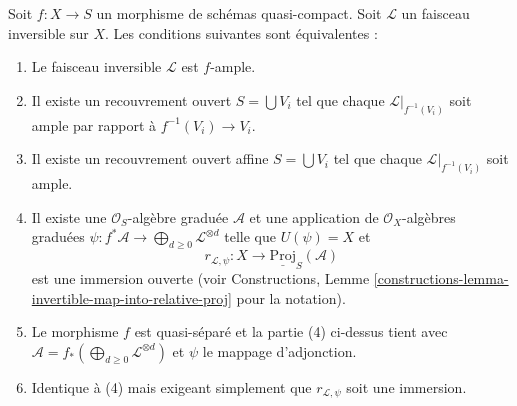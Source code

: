 \begin{lemma}
\label{lemma-characterize-relatively-ample}
\begin{reference}
\cite[II, Proposition 4.6.3]{EGA}
\end{reference}
Soit $f : X \to S$ un morphisme de schémas quasi-compact. Soit $\mathcal{L}$
un faisceau inversible sur $X$. Les conditions
suivantes sont équivalentes :
\begin{enumerate}
\item Le faisceau inversible $\mathcal{L}$ est $f$-ample.
\item Il existe un recouvrement ouvert $S = \bigcup V_i$
tel que chaque $\mathcal{L}|_{f^{-1}(V_i)}$ soit ample
par rapport à $f^{-1}(V_i) \to V_i$.
\item Il existe un recouvrement ouvert affine $S = \bigcup V_i$
tel que chaque $\mathcal{L}|_{f^{-1}(V_i)}$ soit ample.
\item Il existe une $\mathcal{O}_S$-algèbre graduée
$\mathcal{A}$ et une application de $\mathcal{O}_X$-algèbres
graduées $\psi : f^*\mathcal{A} \to \bigoplus_{d \geq 0} \mathcal{L}^{\otimes d}$ telle que
$U(\psi) = X$ et
$$
r_{\mathcal{L}, \psi} :
X
\longrightarrow
\underline{\text{Proj}}_S(\mathcal{A})
$$
est une immersion ouverte (voir
Constructions, Lemme \ref{constructions-lemma-invertible-map-into-relative-proj} pour la notation).
\item Le morphisme $f$ est quasi-séparé
et la partie
(4) ci-dessus tient avec $\mathcal{A} = f_*(\bigoplus_{d \geq 0} \mathcal{L}^{\otimes d})$ et $\psi$
le mappage d'adjonction.
\item Identique à (4) mais exigeant simplement que $r_{\mathcal{L}, \psi}$ soit
une immersion.
\end{enumerate}
\end{lemma}

